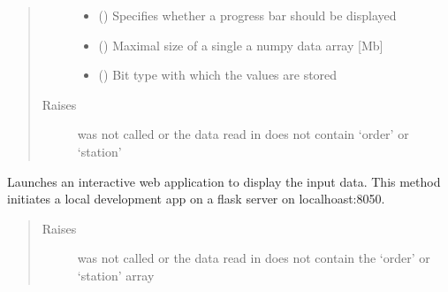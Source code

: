 \documentclass[letterpaper,10pt,english]{sphinxmanual}
\begin{document}
\begin{fulllineitems}
\begin{fulllineitems}
\begin{quote}
\begin{description}
\begin{itemize}
\item {} 
\sphinxAtStartPar
{} (\sphinxstyleliteralemphasis{\sphinxupquote{, }}) \textendash{} Specifies whether a progress bar should be displayed

\item {} 
\sphinxAtStartPar
{} (\sphinxstyleliteralemphasis{\sphinxupquote{, }}) \textendash{} Maximal size of a single a numpy data array {[}Mb{]}

\item {} 
\sphinxAtStartPar
{} (\sphinxstyleliteralemphasis{\sphinxupquote{, }}) \textendash{} Bit type with which the values are stored

\end{itemize}

\item[{Raises}] \leavevmode
\sphinxAtStartPar
{} \textendash{}  was not called or the data read in does not contain ‘order’ or ‘station’

\end{description}\end{quote}

\end{fulllineitems}


\begin{fulllineitems}
\label{\detokenize{source/API/api:environment.Environment.visualize}}
\sphinxAtStartPar
Launches an interactive web application to display the input data.
This method initiates a local development app on a flask server on localhoast:8050.
\begin{quote}\begin{description}
\item[{Raises}] \leavevmode
\sphinxAtStartPar
{} \textendash{}  was not called or the data read in does not contain the ‘order’ or ‘station’
array


\end{description}
\end{quote}
\end{fulllineitems}
\end{fulllineitems}
\end{document}
